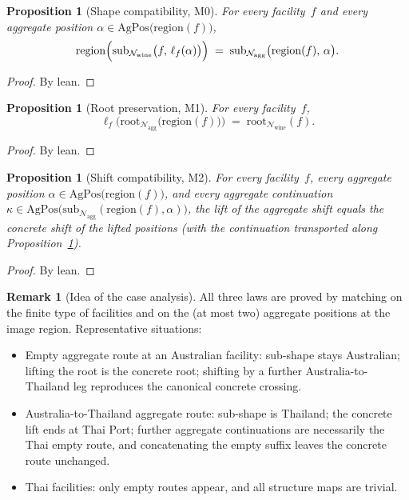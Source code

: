 \documentclass[11pt,a4paper]{article}
\theoremstyle{plain}
\newtheorem{proposition}[theorem]{Proposition}
\theoremstyle{definition}
\newtheorem{remark}[theorem]{Remark}
\newcommand{\rootpos}{\mathrm{root}}
\newcommand{\sub}{\mathrm{sub}}
\begin{document}
\begin{proposition}[Shape compatibility, M0]\label{prop:m0}
For every facility~$f$ and every aggregate position
$\alpha \in \mathrm{AgPos}\bigl(\mathrm{region}(f)\bigr)$,
\begin{equation}
  \mathrm{region}\Bigl(
    \sub_{\mathcal{N}_{\mathrm{wine}}}\bigl(f,\, \ell_f(\alpha)\bigr)
  \Bigr)
  \;=\;
  \sub_{\mathcal{N}_{\mathrm{agg}}}\bigl(\mathrm{region}(f),\, \alpha\bigr).
\end{equation}
\end{proposition}

\begin{proof}
By lean.
\end{proof}

\begin{proposition}[Root preservation, M1]\label{prop:m1}
For every facility~$f$,
\begin{equation}
  \ell_f\bigl(
    \rootpos_{\mathcal{N}_{\mathrm{agg}}}\bigl(\mathrm{region}(f)\bigr)
  \bigr)
  \;=\;
  \rootpos_{\mathcal{N}_{\mathrm{wine}}}(f).
\end{equation}
\end{proposition}

\begin{proof}
By lean.
\end{proof}

\begin{proposition}[Shift compatibility, M2]\label{prop:m2}
For every facility~$f$, every aggregate position
$\alpha \in \mathrm{AgPos}\bigl(\mathrm{region}(f)\bigr)$, and every aggregate
continuation
$\kappa \in \mathrm{AgPos}\bigl(
  \sub_{\mathcal{N}_{\mathrm{agg}}}(\mathrm{region}(f),\alpha)\bigr)$,
the lift of the aggregate shift equals the concrete shift of the lifted
positions (with the continuation transported along Proposition~\ref{prop:m0}).
\end{proposition}

\begin{proof}
By lean.
\end{proof}

\begin{remark}[Idea of the case analysis]
All three laws are proved by matching on the finite type of facilities and on
the (at most two) aggregate positions at the image region. Representative
situations:
\begin{itemize}
  \item Empty aggregate route at an Australian facility: sub-shape stays
        Australian; lifting the root is the concrete root; shifting by a
        further Australia-to-Thailand leg reproduces the canonical concrete
        crossing.
  \item Australia-to-Thailand aggregate route: sub-shape is Thailand; the
        concrete lift ends at Thai Port; further aggregate continuations are
        necessarily the Thai empty route, and concatenating the empty suffix
        leaves the concrete route unchanged.
  \item Thai facilities: only empty routes appear, and all structure maps are
        trivial.
\end{itemize}
\end{remark}
\end{document}
